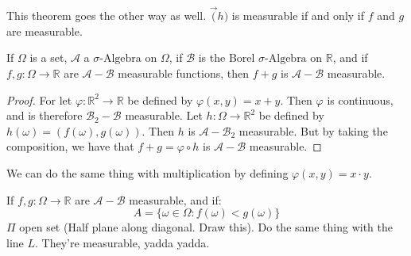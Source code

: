        This theorem goes the other way as well. $\vec(h)$ is measurable if
        and only if $f$ and $g$ are measurable.
        \begin{theorem}
            If $\Omega$ is a set, $\mathcal{A}$ a $\sigma\text{-Algebra}$ on
            $\Omega$, if $\mathcal{B}$ is the Borel $\sigma\text{-Algebra}$ on
            $\mathbb{R}$, and if $f,g:\Omega\rightarrow\mathbb{R}$ are
            $\mathcal{A}-\mathcal{B}$ measurable functions, then $f+g$ is
            $\mathcal{A}-\mathcal{B}$ measurable.
        \end{theorem}
        \begin{proof}
            For let $\varphi:\mathbb{R}^{2}\rightarrow\mathbb{R}$ be defined by
            $\varphi(x,y)=x+y$. Then $\varphi$ is continuous, and is therefore
            $\mathcal{B}_{2}-\mathcal{B}$ measurable. Let
            $h:\Omega\rightarrow\mathbb{R}^{2}$ be defined by
            $h(\omega)=(f(\omega),g(\omega))$. Then $h$ is
            $\mathcal{A}-\mathcal{B}_{2}$ measurable. But by taking the
            composition, we have that $f+g=\varphi\circ{h}$ is
            $\mathcal{A}-\mathcal{B}$ measurable.
        \end{proof}
        We can do the same thing with multiplication by defining
        $\varphi(x,y)=x\cdot{y}$.
        \begin{theorem}
            If $f,g:\Omega\rightarrow\mathbb{R}$ are $\mathcal{A}-\mathcal{B}$
            measurable, and if:
            \begin{equation}
                A=\{\omega\in\Omega:f(\omega)<g(\omega)\}
            \end{equation}
            $\Pi$ open set (Half plane along diagonal. Draw this). Do the same
            thing with the line $L$. They're measurable, yadda yadda.
        \end{theorem}
